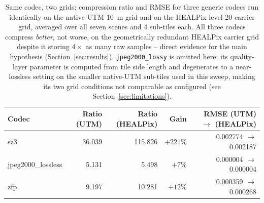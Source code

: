\begin{table}[t]
\centering
\caption{Same codec, two grids: compression ratio and RMSE for three generic codecs run identically on the native UTM \SI{10}{m} grid and on the HEALPix level-20 carrier grid, averaged over all seven scenes and 4 sub-tiles each. All three codecs compress \emph{better}, not worse, on the geometrically redundant HEALPix carrier grid despite it storing $4\times$ as many raw samples -- direct evidence for the main hypothesis (Section~\ref{sec:results}). \texttt{jpeg2000\_lossy} is omitted here: its quality-layer parameter is computed from tile side length and degenerates to a near-lossless setting on the smaller native-UTM sub-tiles used in this sweep, making its two grid conditions not comparable as configured (see Section~\ref{sec:limitations}).}
\label{tab:utm_vs_healpix}
\begin{tabular}{@{}lrrrr@{}}
\toprule
Codec & Ratio (UTM) & Ratio (HEALPix) & Gain & RMSE (UTM) $\to$ (HEALPix) \\
\midrule
sz3                & 36.039 & 115.826 & $+221\%$ & 0.002774 $\to$ 0.002187 \\
jpeg2000\_lossless  & 5.131  & 5.498   & $+7\%$   & 0.000004 $\to$ 0.000004 \\
zfp                 & 9.197  & 10.281  & $+12\%$  & 0.000359 $\to$ 0.000268 \\
\bottomrule
\end{tabular}
\end{table}
